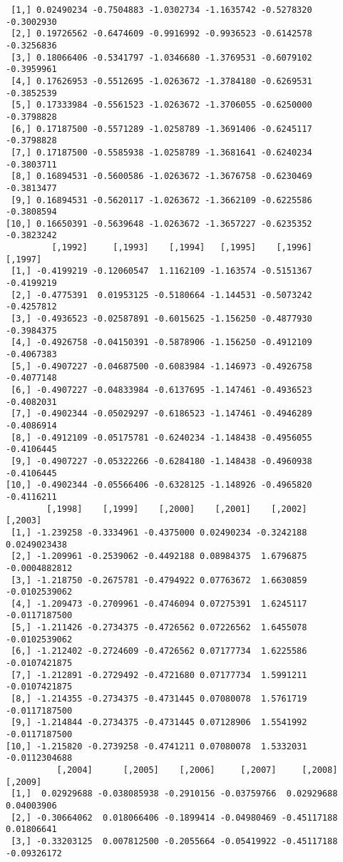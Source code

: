 \documentclass[
  letterpaper,
  DIV=11,
  numbers=noendperiod]{scrreprt}
\begin{document}
\begin{verbatim}
 [1,] 0.02490234 -0.7504883 -1.0302734 -1.1635742 -0.5278320 -0.3002930
 [2,] 0.19726562 -0.6474609 -0.9916992 -0.9936523 -0.6142578 -0.3256836
 [3,] 0.18066406 -0.5341797 -1.0346680 -1.3769531 -0.6079102 -0.3959961
 [4,] 0.17626953 -0.5512695 -1.0263672 -1.3784180 -0.6269531 -0.3852539
 [5,] 0.17333984 -0.5561523 -1.0263672 -1.3706055 -0.6250000 -0.3798828
 [6,] 0.17187500 -0.5571289 -1.0258789 -1.3691406 -0.6245117 -0.3798828
 [7,] 0.17187500 -0.5585938 -1.0258789 -1.3681641 -0.6240234 -0.3803711
 [8,] 0.16894531 -0.5600586 -1.0263672 -1.3676758 -0.6230469 -0.3813477
 [9,] 0.16894531 -0.5620117 -1.0263672 -1.3662109 -0.6225586 -0.3808594
[10,] 0.16650391 -0.5639648 -1.0263672 -1.3657227 -0.6235352 -0.3823242
         [,1992]     [,1993]    [,1994]   [,1995]    [,1996]    [,1997]
 [1,] -0.4199219 -0.12060547  1.1162109 -1.163574 -0.5151367 -0.4199219
 [2,] -0.4775391  0.01953125 -0.5180664 -1.144531 -0.5073242 -0.4257812
 [3,] -0.4936523 -0.02587891 -0.6015625 -1.156250 -0.4877930 -0.3984375
 [4,] -0.4926758 -0.04150391 -0.5878906 -1.156250 -0.4912109 -0.4067383
 [5,] -0.4907227 -0.04687500 -0.6083984 -1.146973 -0.4926758 -0.4077148
 [6,] -0.4907227 -0.04833984 -0.6137695 -1.147461 -0.4936523 -0.4082031
 [7,] -0.4902344 -0.05029297 -0.6186523 -1.147461 -0.4946289 -0.4086914
 [8,] -0.4912109 -0.05175781 -0.6240234 -1.148438 -0.4956055 -0.4106445
 [9,] -0.4907227 -0.05322266 -0.6284180 -1.148438 -0.4960938 -0.4106445
[10,] -0.4902344 -0.05566406 -0.6328125 -1.148926 -0.4965820 -0.4116211
        [,1998]    [,1999]    [,2000]    [,2001]    [,2002]       [,2003]
 [1,] -1.239258 -0.3334961 -0.4375000 0.02490234 -0.3242188  0.0249023438
 [2,] -1.209961 -0.2539062 -0.4492188 0.08984375  1.6796875 -0.0004882812
 [3,] -1.218750 -0.2675781 -0.4794922 0.07763672  1.6630859 -0.0102539062
 [4,] -1.209473 -0.2709961 -0.4746094 0.07275391  1.6245117 -0.0117187500
 [5,] -1.211426 -0.2734375 -0.4726562 0.07226562  1.6455078 -0.0102539062
 [6,] -1.212402 -0.2724609 -0.4726562 0.07177734  1.6225586 -0.0107421875
 [7,] -1.212891 -0.2729492 -0.4721680 0.07177734  1.5991211 -0.0107421875
 [8,] -1.214355 -0.2734375 -0.4731445 0.07080078  1.5761719 -0.0117187500
 [9,] -1.214844 -0.2734375 -0.4731445 0.07128906  1.5541992 -0.0117187500
[10,] -1.215820 -0.2739258 -0.4741211 0.07080078  1.5332031 -0.0112304688
          [,2004]      [,2005]    [,2006]     [,2007]     [,2008]     [,2009]
 [1,]  0.02929688 -0.038085938 -0.2910156 -0.03759766  0.02929688  0.04003906
 [2,] -0.30664062  0.018066406 -0.1899414 -0.04980469 -0.45117188  0.01806641
 [3,] -0.33203125  0.007812500 -0.2055664 -0.05419922 -0.45117188 -0.09326172

\end{verbatim}
\end{document}
